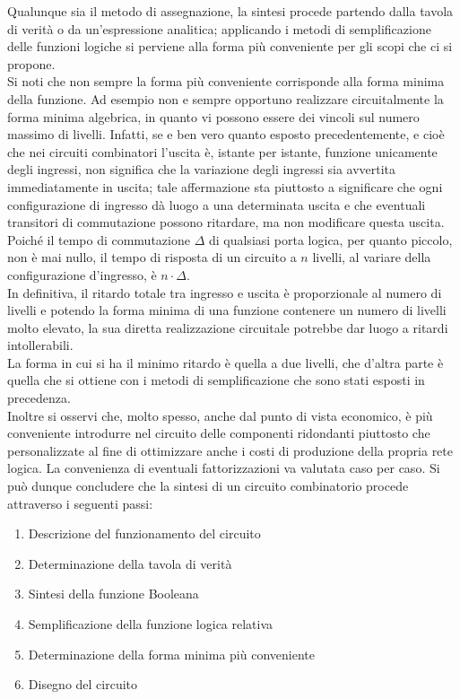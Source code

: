 \documentclass[a4paper]{extarticle}
\begin{document}
\noindent
Qualunque sia il metodo di assegnazione, la sintesi procede partendo dalla tavola di verità o da un’espressione analitica; applicando i metodi di semplificazione delle funzioni logiche si perviene alla forma più conveniente per gli scopi che ci si propone.\\
Si noti che non sempre la forma più conveniente corrisponde alla forma minima della funzione. Ad esempio non e sempre opportuno realizzare circuitalmente la forma minima algebrica, in quanto vi possono essere dei vincoli sul numero massimo di livelli. Infatti, se e ben vero quanto esposto precedentemente, e cioè che nei circuiti combinatori l’uscita è, istante per istante, funzione unicamente degli ingressi, non significa che la variazione degli ingressi sia avvertita immediatamente in uscita; tale affermazione sta piuttosto a significare che ogni configurazione di ingresso dà luogo a una determinata uscita e che eventuali transitori di commutazione possono ritardare, ma non modificare questa uscita.\\
Poiché il tempo di commutazione \(\Delta\) di qualsiasi porta logica, per quanto piccolo, non è mai nullo, il tempo di risposta di un circuito a \(n\) livelli, al variare della configurazione d’ingresso, è \(n \cdot \Delta\).\\
In definitiva, il ritardo totale tra ingresso e uscita è proporzionale al numero di livelli e potendo la forma minima di una funzione contenere un numero di livelli molto elevato, la sua diretta realizzazione circuitale potrebbe dar luogo a ritardi intollerabili.\\
La forma in cui si ha il minimo ritardo è quella a due livelli, che d’altra parte è quella che si ottiene con i metodi di semplificazione che sono stati esposti in precedenza.\\
Inoltre si osservi che, molto spesso, anche dal punto di vista economico, è più conveniente introdurre nel circuito delle componenti ridondanti piuttosto che personalizzate al fine di ottimizzare anche i costi di produzione della propria rete logica. La convenienza di eventuali fattorizzazioni va valutata caso per caso. Si può dunque concludere che la sintesi di un circuito combinatorio procede attraverso i seguenti passi:

\begin{enumerate}
    \item Descrizione del funzionamento del circuito
    \item Determinazione della tavola di verità
    \item Sintesi della funzione Booleana
    \item Semplificazione della funzione logica relativa
    \item Determinazione della forma minima più conveniente
    \item Disegno del circuito
\end{enumerate}
\end{document}
